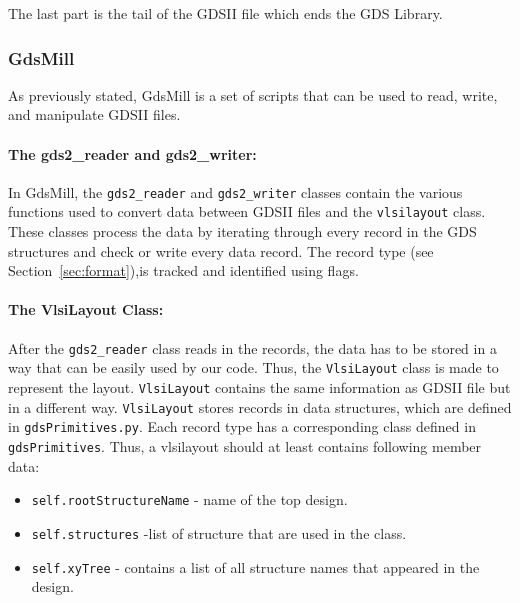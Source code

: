 The last part is the tail of the GDSII file which ends the GDS
Library.


\subsubsection{GdsMill}
\label{sec:gdsmill}

As previously stated, GdsMill is a set of scripts that can be used to read, write, and manipulate GDSII files. 

\paragraph{The gds2\_reader and gds2\_writer:}

In GdsMill, the \verb|gds2_reader| and \verb|gds2_writer| classes contain the various functions used to convert data between GDSII files and the \verb|vlsilayout| class. These classes process the data by iterating through every record in the GDS structures and check or write every data record. The record type (see Section~\ref{sec:format}),is tracked and identified using flags.


\paragraph{The VlsiLayout Class:}
\label{sec:vlsilayout}

After the \verb|gds2_reader| class reads in the records, the data has to be stored in a
way that can be easily used by our code. Thus, the
\verb|VlsiLayout| class is made to represent the layout.
\verb|VlsiLayout| contains the same information as GDSII file but in a
different way. \verb|VlsiLayout| stores records in data structures, which
are defined in \verb|gdsPrimitives.py|.  Each record type has a corresponding class defined in \verb|gdsPrimitives|.  Thus, a vlsilayout should at least
contains following member data:
\begin{itemize}
\item \verb|self.rootStructureName| - name of the top design.
\item \verb|self.structures| -list of structure that are used in the class. 
\item \verb|self.xyTree| - contains a list of all structure names that appeared in the design. 
\end{itemize}

